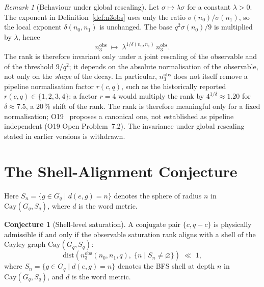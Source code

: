 \documentclass[11pt,a4paper]{article}
\theoremstyle{definition}
\newtheorem{conjecture}[theorem]{Conjecture}
\theoremstyle{remark}
\newtheorem{remark}[theorem]{Remark}
\begin{document}
      \begin{remark}[Behaviour under global rescaling]
        \label{rem:invariance}
        Let $\sigma \mapsto \lambda \sigma$ for a constant
        $\lambda > 0$.
        The exponent in Definition~\ref{def:n3obs} uses only the
        ratio $\sigma(n_0)/\sigma(n_1)$, so the local exponent
        $\delta(n_0,n_1)$ is unchanged.
        The base $q^2\sigma(n_0)/9$ is multiplied by $\lambda$, hence
        \[
          n_3^{\mathrm{obs}} \;\longmapsto\;
          \lambda^{1/\delta(n_0,n_1)}\, n_3^{\mathrm{obs}} .
        \]
        The rank is therefore invariant only under a joint rescaling
        of the observable and of the threshold $9/q^2$; it depends on
        the absolute normalisation of the observable, not only on the
        \emph{shape} of the decay.
        In particular, $n_3^{\mathrm{obs}}$ does not itself remove a
        pipeline normalisation factor $r(c,q)$, such as the historically reported
        $r(c,q) \in \{1,2,3,4\}$: a factor $r=4$ would multiply the rank by
        $4^{1/\delta}\approx 1.20$ for $\delta\approx 7.5$, a $20\,\%$ shift of the rank.
        The rank is therefore meaningful only for a fixed normalisation; O19~\cite{Beau2026a23}
        proposes a canonical one, not established as pipeline independent (O19 Open Problem~7.2).
        The invariance under global rescaling stated in earlier
        versions is withdrawn.
      \end{remark}

  \section{The Shell-Alignment Conjecture}
  \label{sec:shell-conjecture}

  Here $S_n = \{g \in G_q \mid d(e, g) = n\}$ denotes the
  sphere of radius $n$ in $\mathrm{Cay}(G_q, S_q)$, where $d$
  is the word metric.

  \begin{conjecture}[Shell-level saturation]
    \label{conj:shell-saturation}
    A conjugate pair $\{c, q-c\}$ is physically admissible if
    and only if the observable saturation rank aligns with a
    shell of the Cayley graph $\mathrm{Cay}(G_q, S_q)$:
    \[
      \mathrm{dist}\!\left(
                       n_3^{\mathrm{obs}}(n_0, n_1, q),\;
                       \{n \mid S_n \neq \varnothing\}
      \right)
      \;\ll\; 1,
    \]
    where $S_n = \{g \in G_q \mid d(e, g) = n\}$ denotes the
    BFS shell at depth $n$ in $\mathrm{Cay}(G_q, S_q)$, and $d$
    is the word metric.
  \end{conjecture}
\end{document}
